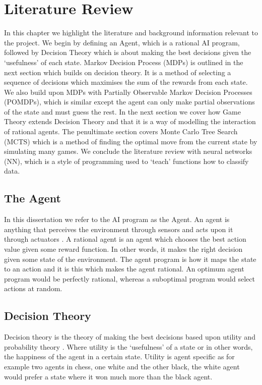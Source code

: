 \documentclass{bhamthesis}
\theoremstyle{definition}
\begin{document}
\chapter{Literature Review}
In this chapter we highlight the literature and background information relevant to the project. We begin by defining an Agent, which is a rational AI program, followed by Decision Theory which is about making the best decisions given the `usefulness' of each state. Markov Decision Process (MDPs) is outlined in the next section which builds on decision theory. It is a method of selecting a sequence of decisions which maximises the sum of the rewards from each state. We also build upon MDPs with Partially Observable Markov Decision Processes (POMDPs), which is similar except the agent can only make partial observations of the state and must guess the rest. In the next section we cover how Game Theory extends Decision Theory and that it is a way of modelling the interaction of rational agents. The penultimate section covers Monte Carlo Tree Search (MCTS) which is a method of finding the optimal move from the current state by simulating many games. We conclude the literature review with neural networks (NN), which is a style of programming used to `teach' functions how to classify data.

\section{The Agent}
In this dissertation we refer to the AI program as the Agent. An agent is anything that perceives the environment through sensors and acts upon it through actuators \cite{Russell2016}. A rational agent is an agent which chooses the best action value given some reward function. In other words, it makes the right decision given some state of the environment. The agent program is how it maps the state to an action and it is this which makes the agent rational. An optimum agent program would be perfectly rational, whereas a suboptimal program would select actions at random.

\section{Decision Theory}
Decision theory is the theory of making the best decisions based upon utility and probability theory \cite{Osborne1994}. Where utility is the `usefulness' of a state or in other words, the happiness of the agent in a certain state. Utility is agent specific as for example two agents in chess, one white and the other black, the white agent would prefer a state where it won much more than the black agent. 
\end{document}
